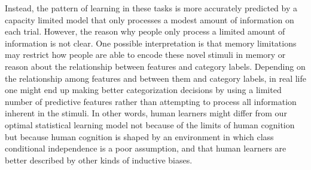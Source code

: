\documentclass[a4paper, doc, floatsintext]{apa6}
\begin{document}
Instead, the pattern of learning in these tasks is more accurately predicted by a capacity limited model that only processes a modest amount of information on each trial. However, the reason why people only process a limited amount of information is not clear. One possible interpretation is that memory limitations may restrict how people are able to encode these novel stimuli in memory or reason about the relationship between features and category labels. Depending on the relationship among features and between them and category labels, in real life one might end up making better categorization decisions by using a limited number of predictive features rather than attempting to process all information inherent in the stimuli. In other words, human learners might differ from our optimal statistical learning model not because of the limits of human cognition but because human cognition is shaped by an environment in which class conditional independence is a poor assumption, and that human learners are better described by other kinds of inductive biases.



\end{document}
